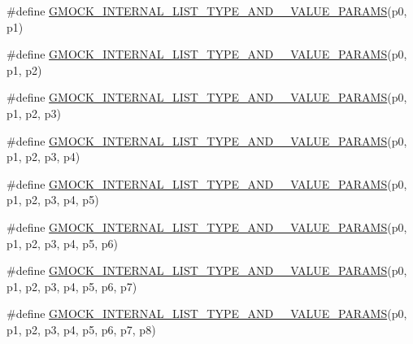 \begin{DoxyCompactItemize}
\item 
\#define \mbox{\hyperlink{googletest-master_2googlemock_2include_2gmock_2gmock-generated-actions_8h_a0cc50d9b0c031e712a38a3266b03af48}{G\+M\+O\+C\+K\+\_\+\+I\+N\+T\+E\+R\+N\+A\+L\+\_\+\+L\+I\+S\+T\+\_\+\+T\+Y\+P\+E\+\_\+\+A\+N\+D\+\_\+\_\+\+V\+A\+L\+U\+E\+\_\+\+P\+A\+R\+A\+MS}}(p0,  p1)
\item 
\#define \mbox{\hyperlink{googletest-master_2googlemock_2include_2gmock_2gmock-generated-actions_8h_a5654c0d7f59fc85880c24738b6cb5976}{G\+M\+O\+C\+K\+\_\+\+I\+N\+T\+E\+R\+N\+A\+L\+\_\+\+L\+I\+S\+T\+\_\+\+T\+Y\+P\+E\+\_\+\+A\+N\+D\+\_\+\_\+\+V\+A\+L\+U\+E\+\_\+\+P\+A\+R\+A\+MS}}(p0,  p1,  p2)
\item 
\#define \mbox{\hyperlink{googletest-master_2googlemock_2include_2gmock_2gmock-generated-actions_8h_ad00ece06c41ce47e499fef47d0ee9459}{G\+M\+O\+C\+K\+\_\+\+I\+N\+T\+E\+R\+N\+A\+L\+\_\+\+L\+I\+S\+T\+\_\+\+T\+Y\+P\+E\+\_\+\+A\+N\+D\+\_\+\_\+\+V\+A\+L\+U\+E\+\_\+\+P\+A\+R\+A\+MS}}(p0,  p1,  p2,  p3)
\item 
\#define \mbox{\hyperlink{googletest-master_2googlemock_2include_2gmock_2gmock-generated-actions_8h_a48e2764f7132a1840c2a4afe8d43556b}{G\+M\+O\+C\+K\+\_\+\+I\+N\+T\+E\+R\+N\+A\+L\+\_\+\+L\+I\+S\+T\+\_\+\+T\+Y\+P\+E\+\_\+\+A\+N\+D\+\_\+\_\+\+V\+A\+L\+U\+E\+\_\+\+P\+A\+R\+A\+MS}}(p0,  p1,  p2,  p3,  p4)
\item 
\#define \mbox{\hyperlink{googletest-master_2googlemock_2include_2gmock_2gmock-generated-actions_8h_ab2f48b9bf3f455e081eac982aee31740}{G\+M\+O\+C\+K\+\_\+\+I\+N\+T\+E\+R\+N\+A\+L\+\_\+\+L\+I\+S\+T\+\_\+\+T\+Y\+P\+E\+\_\+\+A\+N\+D\+\_\+\_\+\+V\+A\+L\+U\+E\+\_\+\+P\+A\+R\+A\+MS}}(p0,  p1,  p2,  p3,  p4,  p5)
\item 
\#define \mbox{\hyperlink{googletest-master_2googlemock_2include_2gmock_2gmock-generated-actions_8h_aa090e804a45b4373d38e6a0aa35e5997}{G\+M\+O\+C\+K\+\_\+\+I\+N\+T\+E\+R\+N\+A\+L\+\_\+\+L\+I\+S\+T\+\_\+\+T\+Y\+P\+E\+\_\+\+A\+N\+D\+\_\+\_\+\+V\+A\+L\+U\+E\+\_\+\+P\+A\+R\+A\+MS}}(p0,  p1,  p2,  p3,  p4,  p5,  p6)
\item 
\#define \mbox{\hyperlink{googletest-master_2googlemock_2include_2gmock_2gmock-generated-actions_8h_ac46093455522025b3461ed0dfd326836}{G\+M\+O\+C\+K\+\_\+\+I\+N\+T\+E\+R\+N\+A\+L\+\_\+\+L\+I\+S\+T\+\_\+\+T\+Y\+P\+E\+\_\+\+A\+N\+D\+\_\+\_\+\+V\+A\+L\+U\+E\+\_\+\+P\+A\+R\+A\+MS}}(p0,  p1,  p2,  p3,  p4,  p5,  p6,  p7)
\item 
\#define \mbox{\hyperlink{googletest-master_2googlemock_2include_2gmock_2gmock-generated-actions_8h_a3f7dd2bdf5feb78d9cd6a538366fed46}{G\+M\+O\+C\+K\+\_\+\+I\+N\+T\+E\+R\+N\+A\+L\+\_\+\+L\+I\+S\+T\+\_\+\+T\+Y\+P\+E\+\_\+\+A\+N\+D\+\_\+\_\+\+V\+A\+L\+U\+E\+\_\+\+P\+A\+R\+A\+MS}}(p0,  p1,  p2,  p3,  p4,  p5,  p6,  p7,  p8)

\end{DoxyCompactItemize}
